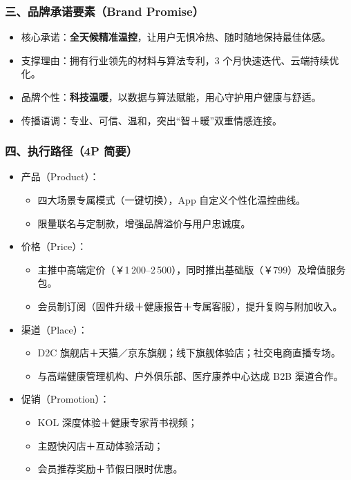 \documentclass[UTF8]{report}
\theoremstyle{MyLineTheoremStyle} %
\theoremstyle{MyBlockTheoremStyle} %
\theoremstyle{MySubsubsectionStyle} %
\begin{document}
  \subsubsection{三、品牌承诺要素（Brand Promise）}
    \begin{itemize}
      \item 核心承诺：\textbf{全天候精准温控}，让用户无惧冷热、随时随地保持最佳体感。  
      \item 支撑理由：拥有行业领先的材料与算法专利，3 个月快速迭代、云端持续优化。  
      \item 品牌个性：\textbf{科技温暖}，以数据与算法赋能，用心守护用户健康与舒适。  
      \item 传播语调：专业、可信、温和，突出“智＋暖”双重情感连接。  
    \end{itemize}

  \subsubsection{四、执行路径（4P 简要）}
    \begin{itemize}
      \item 产品（Product）：  
        \begin{itemize}
          \item 四大场景专属模式（一键切换），App 自定义个性化温控曲线。  
          \item 限量联名与定制款，增强品牌溢价与用户忠诚度。  
        \end{itemize}
      \item 价格（Price）：  
        \begin{itemize}
          \item 主推中高端定价（￥1\,200–2\,500），同时推出基础版（￥799）及增值服务包。  
          \item 会员制订阅（固件升级＋健康报告＋专属客服），提升复购与附加收入。  
        \end{itemize}
      \item 渠道（Place）：  
        \begin{itemize}
          \item D2C 旗舰店＋天猫／京东旗舰；线下旗舰体验店；社交电商直播专场。  
          \item 与高端健康管理机构、户外俱乐部、医疗康养中心达成 B2B 渠道合作。  
        \end{itemize}
      \item 促销（Promotion）：  
        \begin{itemize}
          \item KOL 深度体验＋健康专家背书视频；  
          \item 主题快闪店＋互动体验活动；  
          \item 会员推荐奖励＋节假日限时优惠。  
        \end{itemize}
    \end{itemize}
\end{document}
